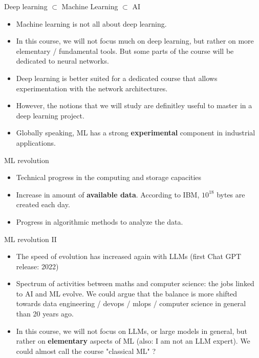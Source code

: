 \documentclass[usenames,dvipsnames]{beamer}
\begin{document}
\begin{frame}{Deep learning $\subset$ Machine Learning $\subset$ AI}

	\begin{itemize}
		\item Machine learning is not all about deep learning.
		\item In this course, we will not focus much on deep learning, but rather on more elementary / fundamental tools. But some parts of the course will be dedicated to neural networks.
		\item Deep learning is better suited for a dedicated course that allows experimentation with the network architectures.
		\item However, the notions that we will study are definitley useful to master in a deep learning project.
		\item Globally speaking, ML has a strong \textbf{experimental} component in industrial applications.
	\end{itemize}
\end{frame}


\begin{frame}{ML revolution}
\begin{itemize}
    \item Technical progress in the computing and storage capacities
    \item Increase in amount of \textbf{available data}. According to IBM, $10^{18}$
        bytes are created each day.
    \item Progress in algorithmic methods to analyze the data.
\end{itemize}
    
\end{frame}

\begin{frame}{ML revolution II}

    \begin{itemize}
	\item The speed of evolution has increased again with LLMs (first Chat GPT release: 2022)
	\item Spectrum of activities between maths and computer science: the jobs linked to AI and ML evolve. We could argue that the balance is more shifted towards data engineering / devops / mlops / computer science in general
	    than 20 years ago.
	\item In this course, we will not focus on LLMs, or large models in general, but rather on \textbf{elementary} aspects of ML (also: I am not an LLM expert). We could almost call the course "classical ML" ?
    \end{itemize}

\end{frame}
\end{document}
